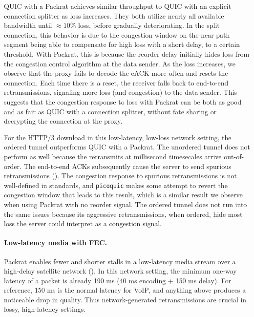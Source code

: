QUIC with a Packrat achieves similar throughput to QUIC with an explicit
connection splitter as loss increases. They both utilize nearly all available
bandwidth until $\approx\!10\%$ loss, before gradually deteriorating. In the
split connection, this behavior is due to the congestion window on the near
path segment being able to compensate for high loss with a short delay, to a
certain threshold. With Packrat, this is because the reorder delay initially
hides loss from the congestion control algorithm at the data sender. As the
loss increases, we observe that the proxy fails to decode the eACK more often
and resets the connection. Each time there is a reset, the receiver falls back
to end-to-end retransmissions, signaling more loss (and congestion) to the data
sender. This suggests that the congestion response to loss with Packrat can be
both as good and as fair as QUIC with a connection splitter, without fate
sharing or decrypting the connection at the proxy.



For the HTTP/3 download in this low-latency, low-loss network setting, the
ordered tunnel outperforms QUIC with a Packrat. The unordered tunnel does not
perform as well because the retransmits at millisecond timesecales arrive
out-of-order. The end-to-end ACKs subsequently cause the server to send
spurious retransmissions (). The congestion response to
spurious retransmissions is not well-defined in standards, and \texttt
{picoquic} makes some attempt to revert the congestion window that leads to
this result, which is a similar result we observe when using Packrat with no
reorder signal. The ordered tunnel does not run into the same issues because
its aggressive retransmissions, when ordered, hide most loss the server could
interpret as a congestion signal.

\paragraph{Low-latency media with FEC.}

Packrat enables fewer and shorter stalls in a low-latency media stream over a
high-delay satellite network (). In this network setting,
the minimum one-way latency of a packet is already 190 ms (40 ms encoding + 150
ms delay). For reference, 150 ms is the normal latency for VoIP, and anything
above produces a noticeable drop in quality. Thus network-generated
retransmissions are crucial in lossy, high-latency settings.

